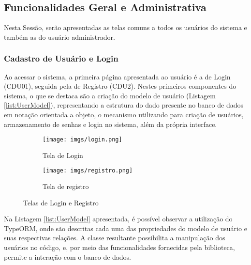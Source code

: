 \subsection{Funcionalidades Geral e Administrativa} \label{subsec:constr:admin}

Nesta Sessão, serão apresentadas as telas comuns a todos os usuários do sistema e também as do usuário administrador.

\subsubsection{Cadastro de Usuário e Login}
Ao acessar o sistema, a primeira página apresentada ao usuário é a de Login (CDU01), seguida pela de Registro (CDU2). Nestes primeiros componentes do sistema, o que se destaca são a criação do modelo de usuário (Listagem \ref{list:UserModel}), representando a estrutura do dado presente no banco de dados em notação orientada a objeto, o mecanismo utilizando para criação de usuários, armazenamento de senhas e login no sistema, além da própria interface.


\begin{figure}[H]
    \centering
    \begin{subfigure}[h]{0.49\textwidth}
        \centering
        \texttt{[image: imgs/login.png]}
        \caption{Tela de Login}
        \label{fig:card}
    \end{subfigure}
    \begin{subfigure}[h]{0.49\textwidth}
        \centering
        \texttt{[image: imgs/registro.png]}
        \caption{Tela de registro}
        \label{fig:ccard1}
    \end{subfigure}
     \caption{Telas de Login e Registro}
    \label{fig:criacao:curso:dpto}
\end{figure}




Na Listagem {\ref{list:UserModel}} apresentada, é possível observar a utilização do TypeORM, onde são descritas cada uma das propriedades do modelo de usuário e suas respectivas relações. A classe resultante possibilita a manipulação dos usuários no código, e, por meio das funcionalidades fornecidas pela biblioteca, permite a interação com o banco de dados.

